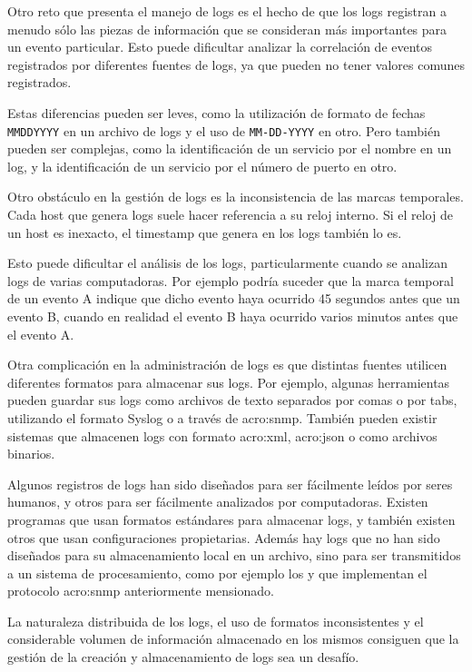 Otro reto que presenta el manejo de logs es el hecho de que los logs registran
a menudo sólo las piezas de información que se consideran más importantes para
un evento particular. Esto puede dificultar analizar la correlación de
eventos registrados por diferentes fuentes de logs, ya que pueden no tener
valores comunes registrados.

Estas diferencias pueden ser leves, como la utilización de formato de fechas
\texttt{MMDDYYYY} en un archivo de logs y el uso de \texttt{MM-DD-YYYY} en
otro. Pero también pueden ser complejas, como la identificación de un servicio
por el nombre en un log, y la identificación de un servicio por el número de
puerto en otro.

Otro obstáculo en la gestión de logs es la inconsistencia de las marcas
temporales. Cada host que genera logs suele hacer referencia a su reloj
interno. Si el reloj de un host es inexacto, el timestamp que genera en los
logs también lo es.

Esto puede dificultar el análisis de los logs, particularmente cuando se
analizan logs de varias computadoras. Por ejemplo podría suceder que la marca
temporal de un evento A indique que dicho evento haya ocurrido 45 segundos
antes que un evento B, cuando en realidad el evento B haya ocurrido varios
minutos antes que el evento A.

Otra complicación en la administración de logs es que distintas fuentes
utilicen diferentes formatos para almacenar sus logs. Por ejemplo, algunas
herramientas pueden guardar sus logs como archivos de texto separados por comas
o por tabs, utilizando el formato Syslog o a través de \gls{acro:snmp}. También
pueden existir sistemas que almacenen logs con formato \gls{acro:xml},
\gls{acro:json} o como archivos binarios.

Algunos registros de logs han sido diseñados para ser fácilmente leídos por
seres humanos, y otros para ser fácilmente analizados por computadoras. Existen
programas que usan formatos estándares para almacenar logs, y también existen
otros que usan configuraciones propietarias. Además hay logs que no han sido
diseñados para su almacenamiento local en un archivo, sino para ser
transmitidos a un sistema de procesamiento, como por ejemplo los 
y  que implementan el protocolo
\gls{acro:snmp}\cite[p.~23]{monitoreo:log_management_guide} anteriormente
mensionado.

La naturaleza distribuida de los logs, el uso de formatos inconsistentes y el
considerable volumen de información almacenado en los mismos consiguen que la
gestión de la creación y almacenamiento de logs sea un desafío.

